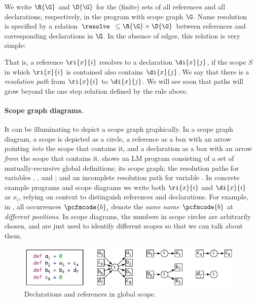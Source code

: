 We write $\R{\G}$ and $\D{\G}$ for the (finite) sets of all 
references and all declarations, respectively, in the program with scope graph $\G$. 
Name resolution is specified by a relation
$\resolve\; \; \subseteq \R{\G} \times \D{\G}$ 
between references and corresponding declarations in $\G$.
In the absence of edges, this relation is very simple:

\vspace*{-\baselineskip}

\begin{center}
\end{center}

\vspace*{-0.5\baselineskip}

\noindent
That is, a reference $\ri{x}{i}$ resolves to a declaration $\di{x}{j}$, if the scope $S$ in
which $\ri{x}{i}$ is contained also contains $\di{x}{j}$. 
We say that there is a \emph{resolution path} from $\ri{x}{i}$ to $\di{x}{j}$. We will see
soon that paths will grow beyond the one step relation defined by the rule
above.


\paragraph{Scope graph diagrams.}

It can be illuminating to depict a scope graph graphically. In a scope graph
diagram, a scope is depicted as a circle, a reference as a box with an arrow
pointing \emph{into} the scope that contains it, and a declaration as a box with
an arrow \emph{from} the scope that contains it. 
 shows an LM program consisting of a set of mutually-recursive
global definitions; its scope graph; 
the resolution paths for variables , , and ;
and an incomplete resolution path for variable .
In concrete example programs and scope diagrams we write both $\ri{x}{i}$ and
$\di{x}{i}$ as $x_i$, relying on context to distinguish references and declarations.
For example, in , all occurrences $\pcfmcode{b}_i$ denote
the \emph{same name} $\pcfmcode{b}$ at \emph{different positions}.
In scope diagrams, the numbers in scope circles are arbitrarily chosen,
and are just used to identify 
different scopes so that we can talk about them.

\begin{figure}[t]
\begin{boxedminipage}{\hsize}
\centering
\includegraphics{figures/scope-graphs/global/example.pdf}
\end{boxedminipage}
\vspace*{-\baselineskip}
\caption{Declarations and references in global scope.}
\end{figure}


